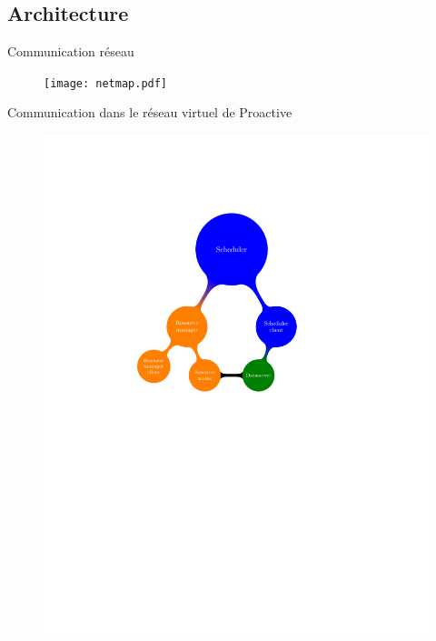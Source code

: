 \documentclass{beamer}
\begin{document}
\subsection{Architecture}

\begin{frame}{Communication réseau}
    \vspace{-1.9cm}
    \begin{figure}
        \hspace*{-1.8cm}
        \centering
        \texttt{[image: netmap.pdf]}
    \end{figure}
    
\end{frame}

\begin{frame}{Communication dans le réseau virtuel de Proactive}
    \vspace{-2.9cm}
    \begin{figure}
        \hspace*{-1.2cm}
        \centering
        \includegraphics[scale=0.62]{netmap_abs.pdf}
    \end{figure}
    
\end{frame}
\end{document}
